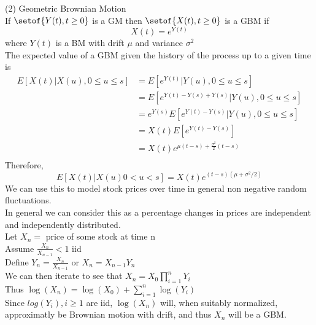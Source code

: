 \documentclass[answers,12pt,addpoints]{exam}
\begin{document}
(2) Geometric Brownian Motion\\
If $\setof{Y(t), t \geq 0}$ is a GM then $\setof{X(t), t \geq 0}$ is a GBM if
$$X(t) = e^{Y(t)}$$
where $Y(t)$ is a BM with drift $\mu$ and variance $\sigma^2$\\
The expected value of a GBM given the history of the process up to a given time is 
\begin{align*}
    E[X(t)| X(u), 0 \leq u \leq s] &= E[e^{Y(t)} | Y(u), 0 \leq u \leq s] \\
    &= E[e^{Y(t) - Y(s) + Y(s)} | Y(u), 0 \leq u \leq s] \\
    &= e^{Y(s)} E[e^{Y(t) - Y(s)} | Y(u), 0 \leq u \leq s] \\
    &= X(t) E[e^{Y(t) - Y(s)} ]\\ 
    &= X(t) e^{\mu(t-s) + \frac{\sigma^2}{2}(t-s)}\\
\end{align*}
Therefore, 
$$ E[X(t) | X(u) 0 < u < s] = X(t) e^{(t-s)(\mu + \sigma^2/2)}$$
We can use this to model stock prices over time in general non negative random fluctuations.\\
In general we can consider this as a percentage changes in prices are independent and independently distributed.\\
Let $X_n = $ price of some stock at time n\\
Assume $\frac{X_n}{X_{n-1}} < 1$ iid \\
Define $Y_n = \frac{X_n}{X_{n-1}}$ or $X_n = X_{n-1}Y_n$\\
We can then iterate to see that $X_n = X_0 \prod_{i=1}^{n} Y_i$\\
Thus $\log(X_n) = \log(X_0) + \sum_{i=1}^{n} \log(Y_i)$\\
Since $log(Y_i), i \geq 1$ are iid, $\log(X_n)$ will, when suitably normalized, approximatly be Brownian motion with drift, and thus $X_n$ will be a GBM.\\
\end{document}
